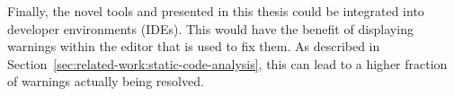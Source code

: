 Finally, the novel tools \toolGeiger{} and \toolSafer{} presented in this thesis could be integrated into developer
environments (\acrshort{IDE}s).
This would have the benefit of displaying warnings within the editor that is used to fix them.
As described in Section~\ref{sec:related-work:static-code-analysis}, this can lead to a higher fraction of warnings
actually being resolved.


